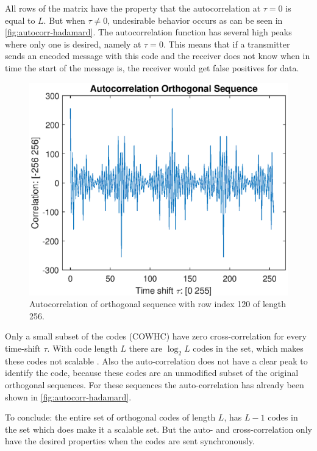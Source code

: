 All rows of the matrix have the property that the autocorrelation at $\tau = 0$ is equal to $L$.
But when $\tau \neq 0$, undesirable behavior occurs as can be seen in \autoref{fig:autocorr-hadamard}.
The autocorrelation function has several high peaks where only one is desired, namely at $\tau = 0$.
This means that if a transmitter sends an encoded message with this code and the receiver does not know when in time the start of the message is, the receiver would get false positives for data.

\begin{figure}[t]
	\centering
	\includegraphics[width=\textwidth]{chapters/cdma-chapters/codes/autocorr-hadamard.eps}
	\caption{Autocorrelation of orthogonal sequence with row index 120 of length 256.}
	\label{fig:autocorr-hadamard}
\end{figure}



Only a small subset of the codes (COWHC) have zero cross-correlation for every time-shift $\tau$.
With code length $L$ there are $\log_2 L$ codes in the set, which makes these codes not scalable \cite{1182447}. 
Also the auto-correlation does not have a clear peak to identify the code, because these codes are an unmodified subset of the original orthogonal sequences.
For these sequences the auto-correlation has already been shown in \autoref{fig:autocorr-hadamard}.

To conclude: the entire set of orthogonal codes of length $L$, has $L - 1$ codes in the set which does make it a scalable set.
But the auto- and cross-correlation only have the desired properties when the codes are sent synchronously. 

